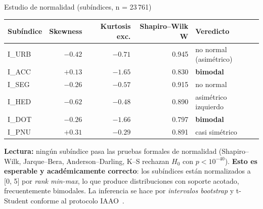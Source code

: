 \documentclass[aspectratio=169,11pt]{beamer}
\newcommand{\hi}[1]{\textcolor{inmuGreen}{\textbf{#1}}}
\begin{document}
\begin{frame}{Estudio de normalidad (subíndices, n = 23\,761)}
  \footnotesize
  \begin{center}
  \begin{tabular}{lrrrl}
    \toprule
    \textbf{Subíndice} & \textbf{Skewness} & \textbf{Kurtosis exc.} &
    \textbf{Shapiro--Wilk W} & \textbf{Veredicto} \\
    \midrule
    I\_URB             &  $-0.42$ &  $-0.71$ & 0.945 & no normal (asimétrico) \\
    I\_ACC             &  $+0.13$ &  $-1.65$ & 0.830 & \hi{bimodal} \\
    I\_SEG             &  $-0.26$ &  $-0.57$ & 0.915 & no normal \\
    I\_HED             &  $-0.62$ &  $-0.48$ & 0.890 & asimétrico izquierdo \\
    I\_DOT             &  $-0.26$ &  $-1.66$ & 0.797 & \hi{bimodal} \\
    I\_PNU             &  $+0.31$ &  $-0.29$ & 0.891 & casi simétrico \\
    \bottomrule
  \end{tabular}
  \end{center}
  \vspace{0.4em}
  \footnotesize
  \textbf{Lectura:} ningún subíndice pasa las pruebas formales de
  normalidad (Shapiro--Wilk, Jarque--Bera, Anderson--Darling, K--S
  rechazan $H_0$ con $p < 10^{-40}$). \hi{Esto es esperable y
  académicamente correcto}: los subíndices están normalizados a [0, 5]
  por \textit{rank min-max}, lo que produce distribuciones con soporte
  acotado, frecuentemente bimodales. La inferencia se hace por
  \emph{intervalos bootstrap} y t-Student conforme al protocolo
  IAAO~\cite{iaao2013, student1908}.
\end{frame}
\end{document}
